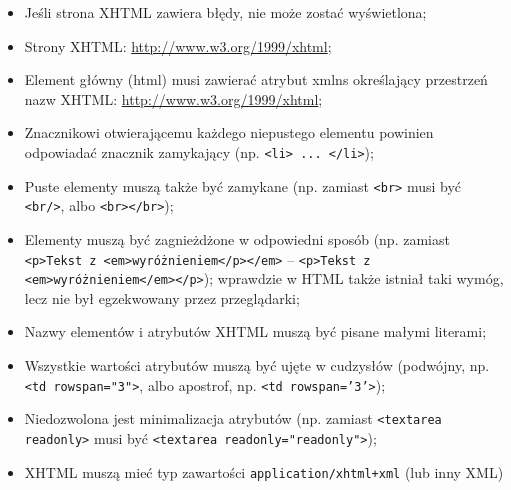 \begin{itemize}
\item Jeśli strona XHTML zawiera błędy, nie może zostać wyświetlona;
\item Strony XHTML: \url{http://www.w3.org/1999/xhtml};
\item Element główny (html) musi zawierać atrybut xmlns określający przestrzeń nazw XHTML: \url{http://www.w3.org/1999/xhtml};
\item Znacznikowi otwierającemu każdego niepustego elementu powinien odpowiadać znacznik zamykający (np. \texttt{<li> ... </li>});
\item Puste elementy muszą także być zamykane (np. zamiast \texttt{<br>} musi być \texttt{<br/>}, albo \texttt{<br></br>});
\item Elementy muszą być zagnieżdżone w odpowiedni sposób (np. zamiast \texttt{<p>Tekst z <em>wyróżnieniem</p></em>} -- \texttt{<p>Tekst z <em>wyróżnieniem</em></p>}); wprawdzie w HTML także istniał taki wymóg, lecz nie był egzekwowany przez przeglądarki;
\item Nazwy elementów i atrybutów XHTML muszą być pisane małymi literami;
\item Wszystkie wartości atrybutów muszą być ujęte w cudzysłów (podwójny, np. \texttt{<td rowspan="3">}, albo apostrof, np. \texttt{<td rowspan='3'>});
\item Niedozwolona jest minimalizacja atrybutów (np. zamiast \texttt{<textarea readonly>} musi być \texttt{<textarea readonly="readonly">});
\item XHTML muszą mieć typ zawartości \texttt{application/xhtml+xml} (lub inny XML)
\end{itemize}
